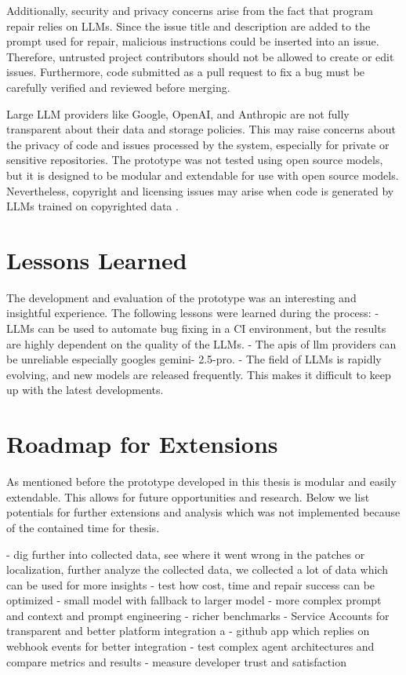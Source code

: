 Additionally, security and privacy concerns arise from the fact that program repair relies on LLMs. Since the issue title and description are added to the prompt used for repair, malicious instructions could be inserted into an issue. Therefore, untrusted project contributors should not be allowed to create or edit issues. Furthermore, code submitted as a pull request to fix a bug must be carefully verified and reviewed before merging.

Large LLM providers like Google, OpenAI, and Anthropic are not fully transparent about their data and storage policies. This may raise concerns about the privacy of code and issues processed by the system, especially for private or sensitive repositories. The prototype was not tested using open source models, but it is designed to be modular and extendable for use with open source models. Nevertheless, copyright and licensing issues may arise when code is generated by LLMs trained on copyrighted data \cite{sauvolaFutureSoftwareDevelopment2024, houLargeLanguageModels2024}.

\section{Lessons Learned}
The development and evaluation of the prototype was an interesting and insightful experience. The following lessons were learned during the process:
- LLMs can be used to automate bug fixing in a CI environment, but the results are highly dependent on the quality of the LLMs.
- The apis of llm providers can be unreliable especially googles gemini- 2.5-pro.
- The field of LLMs is rapidly evolving, and new models are released frequently. This makes it difficult to keep up with the latest developments.


\section{Roadmap for Extensions} \label{section:roadmap}
As mentioned before the prototype developed in this thesis is modular and easily extendable. This allows for future opportunities and research. Below we list potentials for further extensions and analysis which was not implemented because of the contained time for thesis.

- dig further into collected data, see where it went wrong in the patches or localization, further analyze the collected data, we collected a lot of data which can be used for more insights
- test how cost, time and repair success can be optimized
- small model with fallback to larger model
- more complex prompt and context and prompt engineering
- richer benchmarks
- Service Accounts for transparent and better platform integration a
- github app which replies on webhook events for better integration
- test complex agent architectures and compare metrics and results
- measure developer trust and satisfaction
